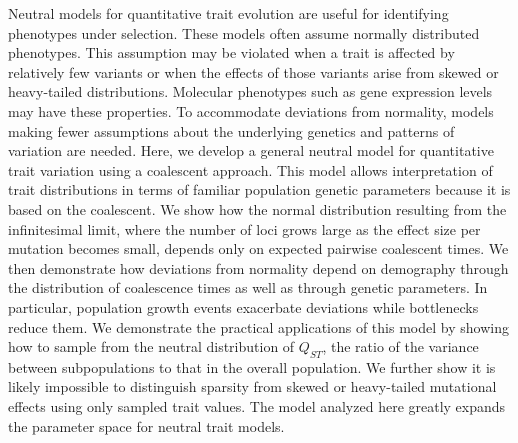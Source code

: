 Neutral models for quantitative trait evolution are useful for identifying
phenotypes under selection. These models often assume normally distributed
phenotypes. This assumption may be violated when a trait is affected by
relatively few variants or when the effects of those variants arise from skewed
or heavy-tailed distributions. Molecular phenotypes such as gene expression
levels may have these properties. To accommodate deviations from normality,
models making fewer assumptions about the underlying genetics and patterns of
variation are needed. Here, we develop a general neutral model for quantitative
trait variation using a coalescent approach. This model allows interpretation of
trait distributions in terms of familiar population genetic parameters because
it is based on the coalescent. We show how the normal distribution resulting
from the infinitesimal limit, where the number of loci grows large as the effect
size per mutation becomes small, depends only on expected pairwise coalescent
times. We then demonstrate how deviations from normality depend on demography
through the distribution of coalescence times as well as through genetic
parameters. In particular, population growth events exacerbate deviations while
bottlenecks reduce them. We demonstrate the practical applications of this model
by showing how to sample from the neutral distribution of $Q_{ST}$, the ratio of
the variance between subpopulations to that in the overall population. We
further show it is likely impossible to distinguish sparsity from skewed or
heavy-tailed mutational effects using only sampled trait values. The model
analyzed here greatly expands the parameter space for neutral trait models.

